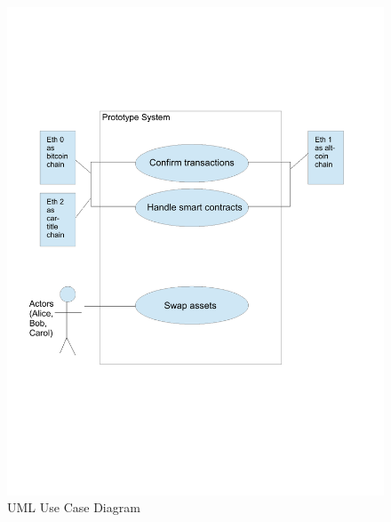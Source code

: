 
\begin{figure}[h]
	\begin{center}
		\includegraphics[width=0.7\paperwidth]{uml}	
		\caption{UML Use Case Diagram}
		\label{fig:uml_use_case}
	\end{center}
\end{figure}


